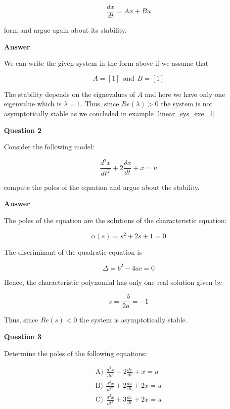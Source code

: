 \begin{equation}
\frac{dx}{dt} = Ax + Bu \nonumber
\end{equation}

form and argue again about its stability.


\textbf{Answer}

We can write the given system in the form above if we assume that

\begin{equation}
A = [1] ~~ \text{and} ~~ B = [1]  \nonumber
\end{equation}

The stability depends on the eignevalues of $A$ and  here we have only one eigenvalue which is $\lambda = 1$. Thus, since $Re(\lambda) > 0 $ the system is not asymptotically stable as we concleded in example 
\ref{linear_sys_exe_1}


\textbf{Question 2}

Consider the following model:

\begin{equation}
\frac{d^2x}{dt^2} + 2\frac{dx}{dt} + x  = u \nonumber
\end{equation}

compute the poles of the equation and argue about the stability.


\textbf{Answer}

The poles of the equation are the solutions of the characteristic equation:

\begin{equation}
\alpha(s) = s^2 + 2s +1 =0  \nonumber
\end{equation}

The discriminant of the quadratic equation is

\begin{equation}
\Delta = b^2 - 4ac =0  \nonumber
\end{equation}

Hence, the characteristic polynomial has only one real solution given by

\begin{equation}
s = \frac{-b}{2a} = -1  \nonumber
\end{equation}

Thus, since $Re(s) < 0 $ the system is asymptotically stable.



\textbf{Question 3}

Determine the poles of the following equations:


\begin{eqnarray}
\text{A)} ~~ \frac{d^2x}{dt^2} + 2\frac{dx}{dt} + x = u \nonumber \\
\text{B)} ~~ \frac{d^2x}{dt^2} + 2\frac{dx}{dt} + 2x = u \nonumber \\
\text{C)} ~~ \frac{d^2x}{dt^2} + 3\frac{dx}{dt} + 2 x  = u \nonumber \\
\end{eqnarray}


